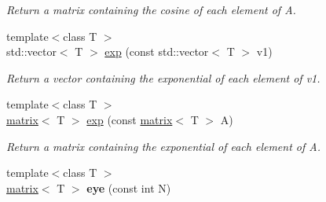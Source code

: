 \begin{DoxyCompactItemize}
\begin{DoxyCompactList}\small\item\em Return a matrix containing the cosine of each element of A. \end{DoxyCompactList}\item 
\hypertarget{namespacekeycpp_aa2d4f2ab79da4b10e9be3af2693904ef}{{\footnotesize template$<$class T $>$ }\\std\-::vector$<$ T $>$ \hyperlink{namespacekeycpp_aa2d4f2ab79da4b10e9be3af2693904ef}{exp} (const std\-::vector$<$ T $>$ v1)}\label{namespacekeycpp_aa2d4f2ab79da4b10e9be3af2693904ef}

\begin{DoxyCompactList}\small\item\em Return a vector containing the exponential of each element of v1. \end{DoxyCompactList}\item 
\hypertarget{namespacekeycpp_a24ac535f72f9e72bf2d0fb93b2b0ee01}{{\footnotesize template$<$class T $>$ }\\\hyperlink{classkeycpp_1_1matrix}{matrix}$<$ T $>$ \hyperlink{namespacekeycpp_a24ac535f72f9e72bf2d0fb93b2b0ee01}{exp} (const \hyperlink{classkeycpp_1_1matrix}{matrix}$<$ T $>$ A)}\label{namespacekeycpp_a24ac535f72f9e72bf2d0fb93b2b0ee01}

\begin{DoxyCompactList}\small\item\em Return a matrix containing the exponential of each element of A. \end{DoxyCompactList}\item 
\hypertarget{namespacekeycpp_a90a6f9aaec03f1f72bf4013316795c5f}{{\footnotesize template$<$class T $>$ }\\\hyperlink{classkeycpp_1_1matrix}{matrix}$<$ T $>$ {\bfseries eye} (const int N)}\label{namespacekeycpp_a90a6f9aaec03f1f72bf4013316795c5f}


\end{DoxyCompactItemize}
